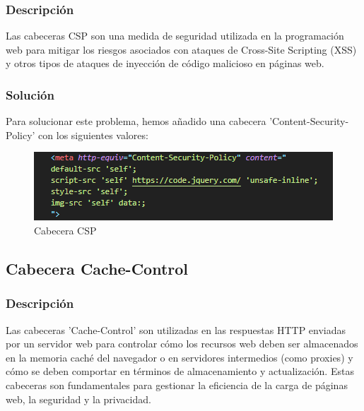 \documentclass{report}
\begin{document}
                \subsubsection{Descripción}
                    Las cabeceras CSP son una medida de seguridad utilizada en la programación web para mitigar los riesgos asociados con ataques de Cross-Site Scripting (XSS) y otros tipos de ataques de inyección de código malicioso en páginas web.
                \subsubsection{Solución}
                    Para solucionar este problema, hemos añadido una cabecera 'Content-Security-Policy' con los siguientes valores:
                    \begin{figure}[H]
                        \centering
                        \includegraphics[width=\textwidth]{./img/vulnerabilidades/3.5/2.1.png}
                        \caption{Cabecera CSP}
                    \end{figure}
            \clearpage
            \subsection{Cabecera Cache-Control}
                \subsubsection{Descripción}
                    Las cabeceras 'Cache-Control' son utilizadas en las respuestas HTTP enviadas por un servidor web para controlar cómo los recursos web deben ser almacenados en la memoria caché del navegador o en servidores intermedios (como proxies) y cómo se deben comportar en términos de almacenamiento y actualización. Estas cabeceras son fundamentales para gestionar la eficiencia de la carga de páginas web, la seguridad y la privacidad.
\end{document}
